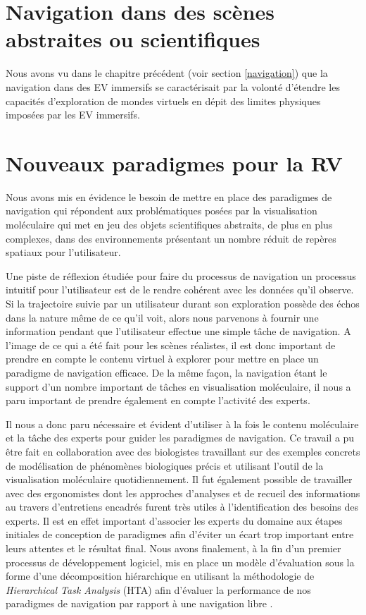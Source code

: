 \section{Navigation dans des scènes abstraites ou scientifiques}

Nous avons vu dans le chapitre précédent (voir section \ref{navigation}) que la navigation dans des EV immersifs se caractérisait par la volonté d'étendre les capacités d'exploration de mondes virtuels en dépit des limites physiques imposées par les EV immersifs.

\section{Nouveaux paradigmes pour la RV}

Nous avons mis en évidence le besoin de mettre en place des paradigmes de navigation qui répondent aux problématiques posées par la visualisation moléculaire qui met en jeu des objets scientifiques abstraits, de plus en plus complexes, dans des environnements présentant un nombre réduit de repères spatiaux pour l'utilisateur.

Une piste de réflexion étudiée pour faire du processus de navigation un processus intuitif pour l'utilisateur est de le rendre cohérent avec les données qu'il observe. Si la trajectoire suivie par un utilisateur durant son exploration possède des échos dans la nature même de ce qu'il voit, alors nous parvenons à fournir une information pendant que l'utilisateur effectue une simple tâche de navigation. A l'image de ce qui a été fait pour les scènes réalistes, il est donc important de prendre en compte le contenu virtuel à explorer pour mettre en place un paradigme de navigation efficace. De la même façon, la navigation étant le support d'un nombre important de tâches en visualisation moléculaire, il nous a paru important de prendre également en compte l'activité des experts. 

Il nous a donc paru nécessaire et évident d'utiliser à la fois le contenu moléculaire et la tâche des experts pour guider les paradigmes de navigation. Ce travail a pu être fait en collaboration avec des biologistes travaillant sur des exemples concrets de modélisation de phénomènes biologiques précis et utilisant l'outil de la visualisation moléculaire quotidiennement. Il fut également possible de travailler avec des ergonomistes dont les approches d'analyses et de recueil des informations au travers d'entretiens encadrés furent très utiles à l'identification des besoins des experts. Il est en effet important d'associer les experts du domaine aux étapes initiales de conception de paradigmes afin d'éviter un écart trop important entre leurs attentes et le résultat final.
Nous avons finalement, à la fin d'un premier processus de développement logiciel, mis en place un modèle d'évaluation sous la forme d'une décomposition hiérarchique en utilisant la méthodologie de \textit{Hierarchical Task Analysis} (HTA) afin d'évaluer la performance de nos paradigmes de navigation par rapport à une navigation libre \cite{annett2003hierarchical}.

